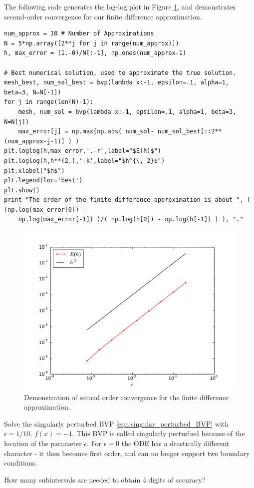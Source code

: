 The following code generates the log-log plot in Figure \ref{fig:finitedifference2}, and demonstrates second-order convergence for our finite difference approximation. 
\begin{lstlisting}
num_approx = 10 # Number of Approximations
N = 5*np.array([2**j for j in range(num_approx)])
h, max_error = (1.-0)/N[:-1], np.ones(num_approx-1)

# Best numerical solution, used to approximate the true solution.
mesh_best, num_sol_best = bvp(lambda x:-1, epsilon=.1, alpha=1, beta=3, N=N[-1])
for j in range(len(N)-1): 
    mesh, num_sol = bvp(lambda x:-1, epsilon=.1, alpha=1, beta=3, N=N[j])
    max_error[j] = np.max(np.abs( num_sol- num_sol_best[::2**(num_approx-j-1)] ) )
plt.loglog(h,max_error,'.-r',label="$E(h)$")
plt.loglog(h,h**(2.),'-k',label="$h^{\, 2}$")
plt.xlabel("$h$")
plt.legend(loc='best')
plt.show()
print "The order of the finite difference approximation is about ", ( (np.log(max_error[0]) - 
    np.log(max_error[-1]) )/( np.log(h[0]) - np.log(h[-1]) ) ), "."
\end{lstlisting}

\begin{figure}[ht]
\centering
\includegraphics[width=12cm]{example_convergence.pdf}
\caption{Demonstration of second order convergence for the finite difference approximation.} \label{fig:finitedifference2}
\end{figure}

\begin{problem}
Solve the singularly perturbed BVP \eqref{eqn:singular_perturbed_BVP} with $\epsilon = 1/10$, $f(x) = -1$.
This BVP is called singularly perturbed because of the location of the parameter $\epsilon$. 
For $\epsilon = 0$ the ODE has a drastically different character - it then becomes first order, and can no longer support two boundary conditions.
	
How many subintervals are needed to obtain 4 digits of accuracy?
	\label{prob:finitedifference2:prob1}
\end{problem}



